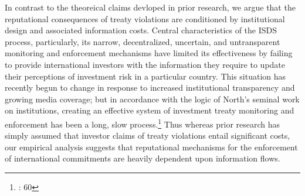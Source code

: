 \documentclass[12pt,onesided]{amsart}
\begin{document}
In contrast to the theoreical claims devloped in prior research, we argue that the reputational consequences of treaty violations are conditioned by institutional design and associated information costs. Central characteristics of the ISDS process, particularly, its narrow, decentralized, uncertain, and untransparent monitoring and enforcement mechanisms have limited its effectiveness by failing to provide international investors with the information they require to update their perceptions of investment risk in a particular country. This situation has recently begun to change in response to increased institutional transparency and growing media coverage; but in accordance with the logic of North's seminal work on institutions, creating an effective system of investment treaty monitoring and enforcement has been a long, slow process.\footnote{\citet{north1990institutions}: 60} Thus whereas prior research has simply assumed that investor claims of treaty violations entail significant costs, our empirical analysis suggests that reputational mechanisms for the enforcement of international commitments are heavily dependent upon information flows.

\end{document}
